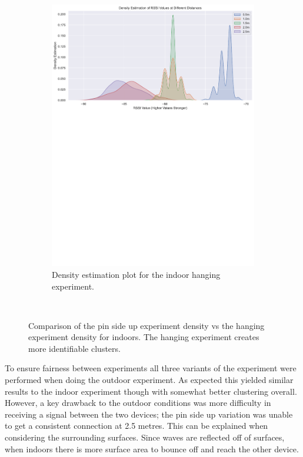 \documentclass{l4proj}
\begin{document}
\begin{figure}[!htb]
\begin{subfigure}[b]{0.45\textwidth}
        \includegraphics[width=\textwidth]{images/indoor_hanging_rssi_density.pdf}
        \caption{ Density estimation plot for the indoor hanging experiment. }
        \label{fig:indoor_hanging_density}
    \end{subfigure}
    ~ %
    \caption{ Comparison of the pin side up experiment density  vs the hanging experiment density for indoors. The hanging experiment creates more identifiable clusters. }
    \label{fig:initial_plots}
\end{figure}

To ensure fairness between experiments all three variants of the experiment were performed when doing the outdoor experiment. As expected this yielded similar results to the indoor experiment though with somewhat better clustering overall. However, a key drawback to the outdoor conditions was more difficulty in receiving a signal between the two devices; the pin side up variation was unable to get a consistent connection at 2.5 metres. This can be explained when considering the surrounding surfaces. Since waves are reflected off of surfaces, when indoors there is more surface area to bounce off and reach the other device.
\end{document}
